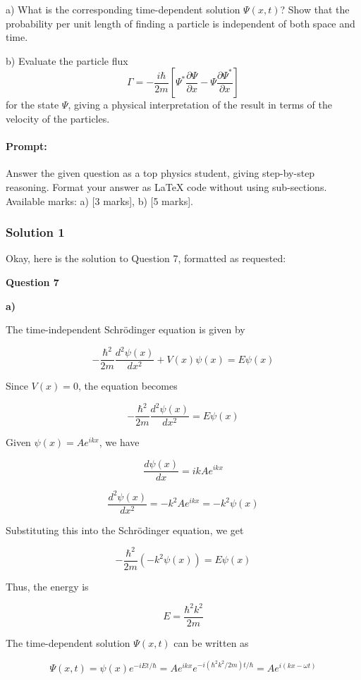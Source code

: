 \documentclass{article}
\begin{document}
a) What is the corresponding time-dependent solution $\Psi(x,t)$? Show that the probability per unit length of finding a particle is independent of both space and time.  

b) Evaluate the particle flux  
\[
\Gamma = -\frac{i \hbar}{2m} \left[ \Psi^* \frac{\partial \Psi}{\partial x} - \Psi \frac{\partial \Psi^*}{\partial x} \right]
\]
for the state $\Psi$, giving a physical interpretation of the result in terms of the velocity of the particles.


\paragraph{Prompt: \\} 
Answer the given question as a top physics student, giving step-by-step reasoning. Format your answer as LaTeX code without using sub-sections. Available marks: a) [3 marks], b) [5 marks].


\subsubsection{Solution 1}
Okay, here is the solution to Question 7, formatted as requested:

\textbf{Question 7}

\textbf{a)}

The time-independent Schrödinger equation is given by

\[
-\frac{\hbar^2}{2m} \frac{d^2 \psi(x)}{dx^2} + V(x) \psi(x) = E \psi(x)
\]

Since $V(x) = 0$, the equation becomes

\[
-\frac{\hbar^2}{2m} \frac{d^2 \psi(x)}{dx^2} = E \psi(x)
\]

Given $\psi(x) = A e^{ikx}$, we have

\[
\frac{d \psi(x)}{dx} = ik A e^{ikx}
\]

\[
\frac{d^2 \psi(x)}{dx^2} = -k^2 A e^{ikx} = -k^2 \psi(x)
\]

Substituting this into the Schrödinger equation, we get

\[
-\frac{\hbar^2}{2m} (-k^2 \psi(x)) = E \psi(x)
\]

Thus, the energy is

\[
E = \frac{\hbar^2 k^2}{2m}
\]

The time-dependent solution $\Psi(x,t)$ can be written as

\[
\Psi(x,t) = \psi(x) e^{-iEt/\hbar} = A e^{ikx} e^{-i(\hbar^2 k^2 / 2m)t/\hbar} = A e^{i(kx - \omega t)}
\]
\end{document}
